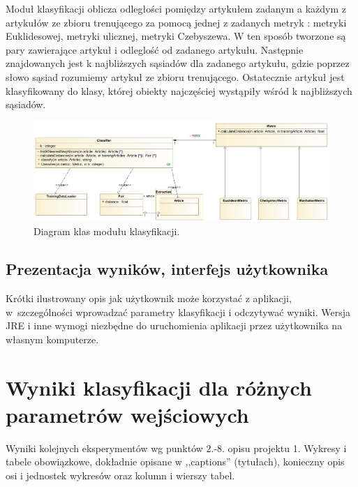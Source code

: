 \documentclass{classrep}
\begin{document}
Moduł klasyfikacji oblicza odległości pomiędzy artykułem zadanym a każdym z artykułów ze zbioru trenującego za pomocą jednej z zadanych metryk \cite{dane} : metryki Euklidesowej, metryki ulicznej, metryki Czebyszewa. W ten sposób tworzone są pary zawierające artykuł i odleglość od zadanego artykułu. Następnie znajdowanych jest k najbliższych sąsiadów dla zadanego artykułu, gdzie poprzez słowo sąsiad rozumiemy artykuł ze zbioru trenującego. Ostatecznie artykuł jest klasyfikowany do klasy, której obiekty najczęściej wystąpiły wśród k najbliższych sąsiadów. 

\begin{figure}[h!]
 \centering
 \includegraphics[width=14cm]{Klasyfikator.png}
 \vspace{-0.3cm}
 \caption{Diagram klas modułu klasyfikacji. }
 \label{rysunek do eksperymentu 1 wariantu 1}
\end{figure}

\newpage

\subsection{Prezentacja wyników, interfejs użytkownika} 
Krótki ilustrowany opis jak użytkownik może korzystać z aplikacji, w~szczególności wprowadzać parametry klasyfikacji i odczytywać wyniki. Wersja JRE i inne wymogi
niezbędne do uruchomienia aplikacji przez użytkownika na własnym komputerze. \\

\section{Wyniki klasyfikacji dla różnych parametrów wejściowych}
Wyniki kolejnych eksperymentów wg punktów 2.-8. opisu projektu 1.  Wykresy i tabele
obowiązkowe, dokładnie opisane w ,,captions'' (tytułach), konieczny opis osi i
jednostek wykresów oraz kolumn i wierszy tabel.\\ 
\end{document}
